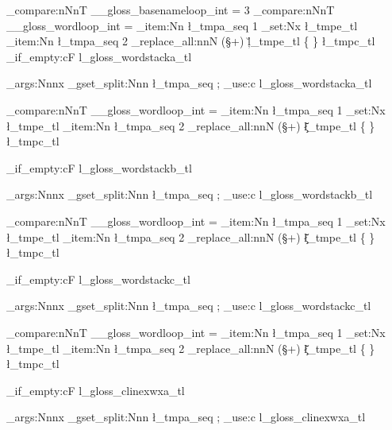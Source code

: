 {{		\int_compare:nNnT
								  { \g__gloss_basenameloop_int } = { 3 }
								  {
		\int_compare:nNnT
								  { \g__gloss_wordloop_int } = { \seq_item:Nn \l_tmpa_seq { 1 } }
								  {
\tl_set:Nx \l_tmpe_tl { \seq_item:Nn \l_tmpa_seq { 2 } }
		\regex_replace_all:nnN
				{ (\S+) }
				{ \c{\u{l_tmpe_tl}} \cB\{ \0 \cE\} }
				\l_tmpc_tl
												}}%
			}%
		\tl_if_empty:cF { l_gloss_wordstacka_tl }
		{  
			\exp_args:Nnnx
	\seq_gset_split:Nnn 
		\l_tmpa_seq
			{ ; } %
			{ \tl_use:c { l_gloss_wordstacka_tl } }
			
					\int_compare:nNnT
{ \g__gloss_wordloop_int } = { \seq_item:Nn \l_tmpa_seq { 1 } }
								  {
\tl_set:Nx \l_tmpe_tl { \seq_item:Nn \l_tmpa_seq { 2 } }		\regex_replace_all:nnN
				{ (\S+) }
				{ \c{\u{\l_tmpe_tl}} \cB\{ \0 \cE\} }
				\l_tmpc_tl
												}%
			}%
		\tl_if_empty:cF { l_gloss_wordstackb_tl }
		{  
			\exp_args:Nnnx
	\seq_gset_split:Nnn 
		\l_tmpa_seq
			{ ; } %
			{ \tl_use:c { l_gloss_wordstackb_tl } }
			
					\int_compare:nNnT
{ \g__gloss_wordloop_int } = { \seq_item:Nn \l_tmpa_seq { 1 } }
								  {
\tl_set:Nx \l_tmpe_tl { \seq_item:Nn \l_tmpa_seq { 2 } }		\regex_replace_all:nnN
				{ (\S+) }
				{ \c{\u{\l_tmpe_tl}} \cB\{ \0 \cE\} }
				\l_tmpc_tl
												}%
			}%
		\tl_if_empty:cF { l_gloss_wordstackc_tl }
		{  
			\exp_args:Nnnx
	\seq_gset_split:Nnn 
		\l_tmpa_seq
			{ ; } %
			{ \tl_use:c { l_gloss_wordstackc_tl } }
			
					\int_compare:nNnT
{ \g__gloss_wordloop_int } = { \seq_item:Nn \l_tmpa_seq { 1 } }
								  {
\tl_set:Nx \l_tmpe_tl { \seq_item:Nn \l_tmpa_seq { 2 } }		\regex_replace_all:nnN
				{ (\S+) }
				{ \c{\u{\l_tmpe_tl}} \cB\{ \0 \cE\} }
				\l_tmpc_tl
												}%
			}%







		\tl_if_empty:cF { l_gloss_clinexwxa_tl }
		{  
			\exp_args:Nnnx
	\seq_gset_split:Nnn 
		\l_tmpa_seq
			{ ; } %
			{ \tl_use:c { l_gloss_clinexwxa_tl } }
			
}}
